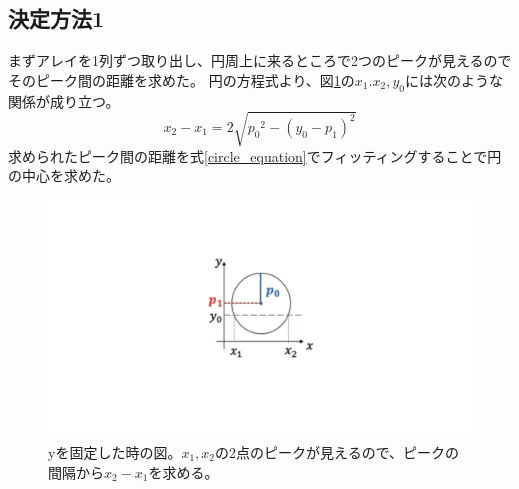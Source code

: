 \documentclass[uplatex, titlepage, dvipdfmx, 12pt, a4paper]{jsreport}
\begin{document}
    \subsection{決定方法1}
      まずアレイを1列ずつ取り出し、円周上に来るところで2つのピークが見えるのでそのピーク間の距離を求めた。
      円の方程式より、図\ref{fig:find_center_image}の$x_1. x_2, y_0$には次のような関係が成り立つ。
      \begin{equation}
        x_2 - x_1 = 2\sqrt{{p_0}^2-{\left(y_0-p_1\right)}^2}
        \label{circle_equation}
      \end{equation}
      求められたピーク間の距離を式\ref{circle_equation}でフィッティングすることで円の中心を求めた。
      \begin{figure}[h]
        \begin{center} 
          \includegraphics[scale=1, clip]{image/find_center1.pdf}
          \caption{yを固定した時の図。$x_1, x_2$の2点のピークが見えるので、ピークの間隔から$x_2-x_1$を求める。} 
          \label{fig:find_center_image} 
        \end{center}
      \end{figure}
\end{document}

